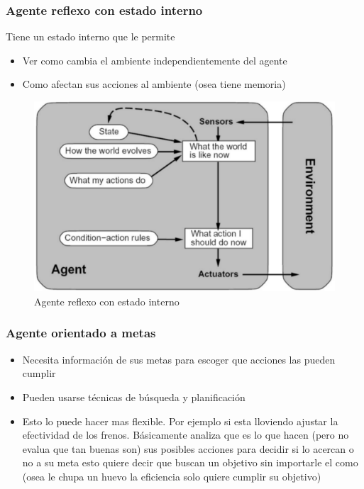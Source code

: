 \subsubsection*{Agente reflexo con estado interno}
Tiene un estado interno que le permite
\begin{itemize}
  \item Ver como cambia el ambiente independientemente del agente
  \item Como afectan sus acciones al ambiente (osea tiene memoria)
\end{itemize}

\begin{figure}
  \centering
  \includegraphics[width=16cm, scale=1]{Images/Imagenes/AgenteReflexoEst.png}
  \caption{Agente reflexo con estado interno}
\end{figure}

\subsubsection*{Agente orientado a metas}
\begin{itemize}
  \item Necesita información de sus metas para escoger que acciones las pueden cumplir
  \item Pueden usarse técnicas de búsqueda y planificación
  \item Esto lo puede hacer mas flexible. Por ejemplo si esta lloviendo ajustar la efectividad de los frenos. Básicamente analiza que es lo que hacen (pero no evalua que tan buenas son) sus posibles acciones para decidir si lo acercan o no a su meta esto quiere decir que buscan un objetivo sin importarle el como (osea le chupa un huevo la eficiencia solo quiere cumplir su objetivo)
\end{itemize}

